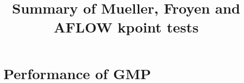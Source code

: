\documentclass[12pt,prb,reprint]{revtex4-1}
\begin{document}
\title{Summary of Mueller, Froyen and AFLOW kpoint tests}




\begin{abstract}

\end{abstract}

\maketitle




\section{Performance of GMP} \label{Performance}
\end{document}
